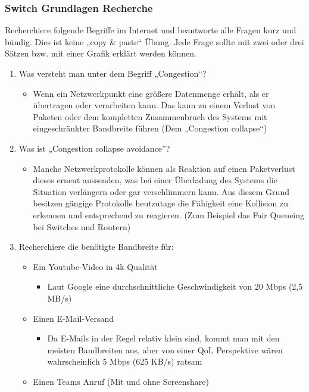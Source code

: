 \documentclass{article}
\begin{document}
	\subsubsection{Switch Grundlagen Recherche}
	Recherchiere folgende Begriffe im Internet und beantworte alle Fragen kurz und bündig. Dies ist keine „copy \& paste“ Übung. Jede Frage sollte mit zwei oder drei Sätzen bzw. mit einer Grafik erklärt werden können.
	\begin{enumerate}
		\item{Was versteht man unter dem Begriff „Congestion“?}
		\begin{itemize}
			\item{Wenn ein Netzwerkpunkt eine größere Datenmenge erhält, als er übertragen oder verarbeiten kann. Das kann zu einem Verlust von Paketen oder dem kompletten Zusammenbruch des Systems mit eingeschränkter Bandbreite führen (Dem „Congestion collapse“)}
		\end{itemize}
		\item{Was ist „Congestion collapse avoidance”?}
		\begin{itemize}
			\item{Manche Netzwerkprotokolle können als Reaktion auf einen Paketverlust dieses erneut aussenden, was bei einer Überladung des Systems die Situation verlängern oder gar verschlimmern kann. Aus diesem Grund besitzen gängige Protokolle heutzutage die Fähigkeit eine Kollision zu erkennen und entsprechend zu reagieren. (Zum Beispiel das Fair Queueing bei Switches und Routern)}
		\end{itemize}
		\item{Recherchiere die benötigte Bandbreite für:}
		\begin{itemize}
			\item[a]{Ein Youtube-Video in 4k Qualität}
			\begin{itemize}
				\item{Laut Google eine durchschnittliche Geschwindigkeit von 20 Mbps (2,5 MB/s)}
			\end{itemize}
			\item[b]{Einen E-Mail-Versand}
			\begin{itemize}
				\item{Da E-Mails in der Regel relativ klein sind, kommt man mit den meisten Bandbreiten aus, aber von einer QoL Perspektive wären wahrscheinlich 5 Mbps (625 KB/s) ratsam}
			\end{itemize}
			\item[c]{Einen Teams Anruf (Mit und ohne Screenshare)}
			\begin{itemize}

\end{itemize}
\end{itemize}
\end{enumerate}
\end{document}
